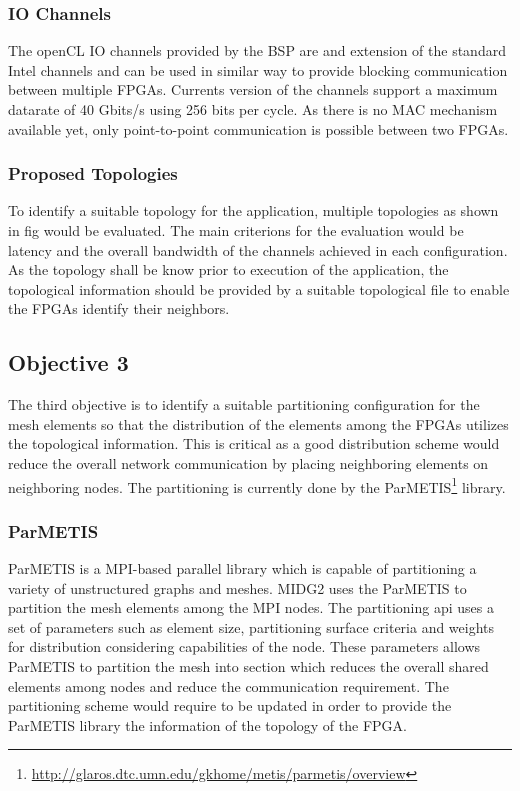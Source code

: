 \documentclass[english,notitlepage]{hgbreport}
\begin{document}
\subsubsection{IO Channels}

The openCL IO channels provided by the BSP are and extension of the standard Intel channels \cite{noauthor_intel_2018}
and can be used in similar way to provide blocking communication between multiple FPGAs.
Currents version of the channels support a maximum datarate of 40 Gbits/s using 256 bits per cycle.
As there is no MAC mechanism available yet, only point-to-point communication is possible between
two FPGAs.

\subsubsection{Proposed Topologies}

To identify a suitable topology for the application, multiple topologies
as shown in fig would be evaluated. The main criterions for the evaluation
would be latency and the overall bandwidth of the channels achieved in each
configuration. As the topology shall be know prior to execution of the application,
the topological information should be provided by a suitable topological file
to enable the FPGAs identify their neighbors.


\subsection{Objective 3}

The third objective is to identify a suitable partitioning configuration for the mesh elements so that
the distribution of the elements among the FPGAs utilizes the topological information. This is critical
as a good distribution scheme would reduce the overall network communication by placing neighboring elements
on neighboring nodes. The partitioning is currently done by the ParMETIS\footnote{\url{http://glaros.dtc.umn.edu/gkhome/metis/parmetis/overview}}
library. 

\subsubsection{ParMETIS}

ParMETIS is a MPI-based parallel library which is capable of partitioning a variety of unstructured graphs and meshes. MIDG2
uses the ParMETIS to partition the mesh elements among the MPI nodes. The partitioning api uses a set of parameters such as element
size, partitioning surface criteria and weights for distribution considering capabilities of the node. These parameters allows
ParMETIS to partition the mesh into section which reduces the overall shared elements among nodes and reduce the communication requirement.
The partitioning scheme would require to be updated in order to provide the ParMETIS library the information of the topology of the FPGA.
\end{document}
